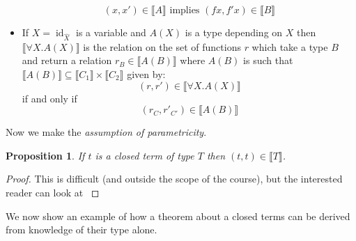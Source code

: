 \documentclass[12pt]{article}
\theoremstyle{plain}
\newtheorem{proposition}[thm]{Proposition}
\theoremstyle{definition}
\begin{document}
\begin{itemize}
\begin{equation*}
				(x,x') \in \llbracket A \rrbracket\text{ implies }(fx, f'x) \in \llbracket B \rrbracket
				\end{equation*}
			\item If $X= \operatorname{id}_{\hat{X}}$ is a variable and $A(X)$ is a type depending on $X$ then $\llbracket \forall X. A(X)\rrbracket$ is the relation on the set of functions $r$ which take a type $B$ and return a relation $r_B \in \llbracket A(B) \rrbracket$ where $A(B)$ is such that $\llbracket A(B) \rrbracket \subseteq \llbracket C_1 \rrbracket \times \llbracket C_2 \rrbracket$ given by:
			\begin{equation*}
				(r,r') \in \llbracket \forall X. A(X) \rrbracket
				\end{equation*}
			if and only if
			\begin{equation*}
				(r_C, r'_{C'}) \in \llbracket A(B) \rrbracket
				\end{equation*}
			\end{itemize}
		Now we make the \emph{assumption of parametricity}.
		\begin{proposition}
			If $t$ is a closed term of type $T$ then $(t,t) \in \llbracket T \rrbracket$.
			\end{proposition}
		\begin{proof}
			This is difficult (and outside the scope of the course), but the interested reader can look at \cite{Wadler}
			\end{proof}
		
		We now show an example of how a theorem about a closed terms can be derived from knowledge of their type alone.
		
\end{document}
